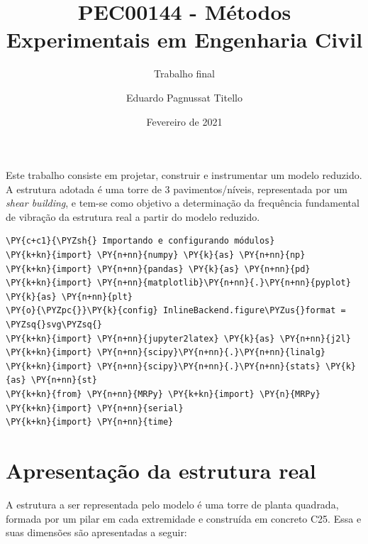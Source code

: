 

\author{Eduardo Pagnussat Titello}
\title{PEC00144 - Métodos Experimentais em Engenharia Civil}
\subtitle{Trabalho final}
\date{Fevereiro de 2021}



	
\maketitle

Este trabalho consiste em projetar, construir e instrumentar um modelo
reduzido. A estrutura adotada é uma torre de 3 pavimentos/níveis,
representada por um \emph{shear building}, e tem-se como objetivo a
determinação da frequência fundamental de vibração da estrutura real a
partir do modelo reduzido.

\tableofcontents
\pagebreak

    \begin{tcolorbox}[breakable, size=fbox, boxrule=1pt, pad at break*=1mm,colback=cellbackground, colframe=cellborder]
\begin{Verbatim}[commandchars=\\\{\}]
\PY{c+c1}{\PYZsh{} Importando e configurando módulos}
\PY{k+kn}{import} \PY{n+nn}{numpy} \PY{k}{as} \PY{n+nn}{np}
\PY{k+kn}{import} \PY{n+nn}{pandas} \PY{k}{as} \PY{n+nn}{pd} 
\PY{k+kn}{import} \PY{n+nn}{matplotlib}\PY{n+nn}{.}\PY{n+nn}{pyplot} \PY{k}{as} \PY{n+nn}{plt}
\PY{o}{\PYZpc{}}\PY{k}{config} InlineBackend.figure\PYZus{}format = \PYZsq{}svg\PYZsq{}
\PY{k+kn}{import} \PY{n+nn}{jupyter2latex} \PY{k}{as} \PY{n+nn}{j2l}
\PY{k+kn}{import} \PY{n+nn}{scipy}\PY{n+nn}{.}\PY{n+nn}{linalg}
\PY{k+kn}{import} \PY{n+nn}{scipy}\PY{n+nn}{.}\PY{n+nn}{stats} \PY{k}{as} \PY{n+nn}{st}
\PY{k+kn}{from} \PY{n+nn}{MRPy} \PY{k+kn}{import} \PY{n}{MRPy}
\PY{k+kn}{import} \PY{n+nn}{serial}
\PY{k+kn}{import} \PY{n+nn}{time}
\end{Verbatim}
\end{tcolorbox}

    \hypertarget{apresentauxe7uxe3o-da-estrutura-real}{%
\section{Apresentação da estrutura
real}\label{apresentauxe7uxe3o-da-estrutura-real}}

A estrutura a ser representada pelo modelo é uma torre de planta
quadrada, formada por um pilar em cada extremidade e construída em
concreto C25. Essa e suas dimensões são apresentadas a seguir:

